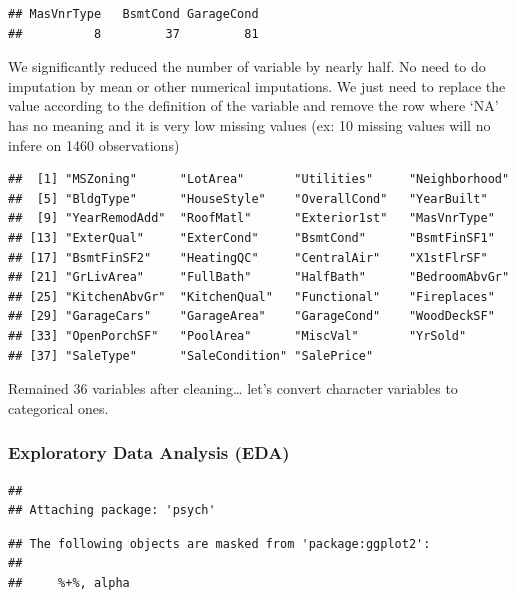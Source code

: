\documentclass[
]{article}
\begin{document}
\begin{verbatim}
## MasVnrType   BsmtCond GarageCond 
##          8         37         81
\end{verbatim}

We significantly reduced the number of variable by nearly half. No need
to do imputation by mean or other numerical imputations. We just need to
replace the value according to the definition of the variable and remove
the row where `NA' has no meaning and it is very low missing values (ex:
10 missing values will no infere on 1460 observations)

\begin{verbatim}
##  [1] "MSZoning"      "LotArea"       "Utilities"     "Neighborhood" 
##  [5] "BldgType"      "HouseStyle"    "OverallCond"   "YearBuilt"    
##  [9] "YearRemodAdd"  "RoofMatl"      "Exterior1st"   "MasVnrType"   
## [13] "ExterQual"     "ExterCond"     "BsmtCond"      "BsmtFinSF1"   
## [17] "BsmtFinSF2"    "HeatingQC"     "CentralAir"    "X1stFlrSF"    
## [21] "GrLivArea"     "FullBath"      "HalfBath"      "BedroomAbvGr" 
## [25] "KitchenAbvGr"  "KitchenQual"   "Functional"    "Fireplaces"   
## [29] "GarageCars"    "GarageArea"    "GarageCond"    "WoodDeckSF"   
## [33] "OpenPorchSF"   "PoolArea"      "MiscVal"       "YrSold"       
## [37] "SaleType"      "SaleCondition" "SalePrice"
\end{verbatim}

Remained 36 variables after cleaning\ldots{} let's convert character
variables to categorical ones.

\hypertarget{exploratory-data-analysis-eda}{%
\subsubsection{Exploratory Data Analysis
(EDA)}\label{exploratory-data-analysis-eda}}

\begin{verbatim}
## 
## Attaching package: 'psych'
\end{verbatim}

\begin{verbatim}
## The following objects are masked from 'package:ggplot2':
## 
##     %+%, alpha
\end{verbatim}
\end{document}
